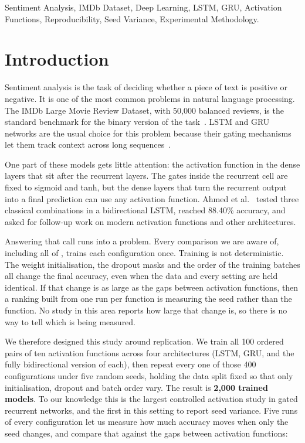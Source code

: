 \documentclass[conference,a4paper]{IEEEtran}
\begin{document}
\begin{IEEEkeywords}
Sentiment Analysis, IMDb Dataset, Deep Learning, LSTM, GRU, Activation Functions, Reproducibility, Seed Variance, Experimental Methodology.
\end{IEEEkeywords}

\section{Introduction}

Sentiment analysis is the task of deciding whether a piece of
text is positive or negative. It is one of the most common
problems in natural language processing. The IMDb Large
Movie Review Dataset, with 50{,}000 balanced reviews, is the
standard benchmark for the binary version of the
task~\cite{maas2011}. LSTM and GRU networks are the usual
choice for this problem because their gating mechanisms let
them track context across long sequences~\cite{hochreiter1997,cho2014,chung2014}.

One part of these models gets little attention: the activation
function in the dense layers that sit after the recurrent
layers. The gates inside the recurrent cell are fixed to
sigmoid and tanh, but the dense layers that turn the recurrent
output into a final prediction can use any activation function.
Ahmed et al.~\cite{ahmed2025} tested three classical
combinations in a bidirectional LSTM, reached 88.40\% accuracy,
and asked for follow-up work on modern activation functions and
other architectures.

Answering that call runs into a problem. Every comparison we are
aware of, including all of
\cite{eger2018,farzad2019,essaiAli2022,zhu2022,ahmed2025}, trains
each configuration once. Training is not deterministic. The weight
initialisation, the dropout masks and the order of the training
batches all change the final accuracy, even when the data and every
setting are held identical. If that change is as large as the gaps
between activation functions, then a ranking built from one run per
function is measuring the seed rather than the function. No study
in this area reports how large that change is, so there is no way
to tell which is being measured.

We therefore designed this study around replication. We train all
100 ordered pairs of ten activation functions across four
architectures (LSTM, GRU, and the fully bidirectional version of
each), then repeat every one of those 400 configurations under five
random seeds, holding the data split fixed so that only
initialisation, dropout and batch order vary. The result is
\textbf{2{,}000 trained models}. To our knowledge this is the
largest controlled activation study in gated recurrent networks,
and the first in this setting to report seed variance. Five runs of
every configuration let us measure how much accuracy moves when
only the seed changes, and compare that against the gaps between
activation functions:
\end{document}

